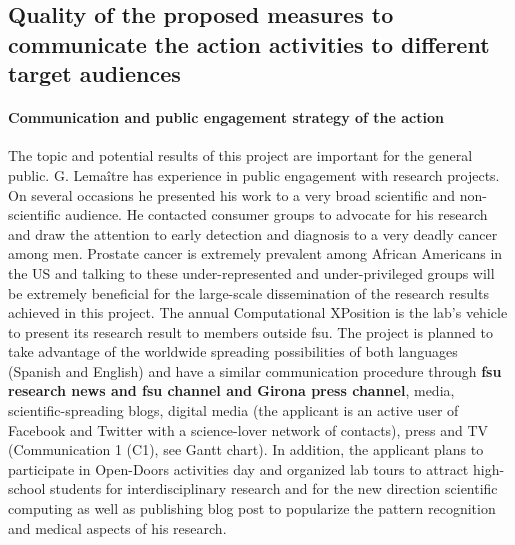 \subsection{Quality of the proposed measures to communicate the action activities to different target audiences}

\paragraph{Communication and public engagement strategy of the action}
The topic and potential results of this project are important for the general public.
G. Lema\^itre has experience in public engagement with research projects.
On several occasions he presented his work to a very broad scientific and non-scientific audience.
He contacted consumer groups to advocate for his research and draw the attention to early detection and diagnosis to a very deadly cancer among men.
Prostate cancer is extremely prevalent among African Americans in the US and talking to these under-represented and under-privileged groups will be extremely beneficial for the large-scale dissemination of the research results achieved in this project.
The annual Computational XPosition is the lab's vehicle to present its research result to members outside \ac{fsu}.
The project is planned to take advantage of the worldwide spreading possibilities of both languages (Spanish and English) and have a similar communication procedure through \textbf{\ac{fsu} research news and \ac{fsu} channel and Girona press channel}, media, scientific-spreading blogs, digital media (the applicant is an active user of Facebook and Twitter with a science-lover network of contacts), press and TV (Communication 1 (C1), see Gantt chart).
In addition, the applicant plans to participate in Open-Doors activities day and organized lab tours to attract high-school students for interdisciplinary research and for the new direction scientific computing as well as publishing blog post to popularize the pattern recognition and medical aspects of his research.
